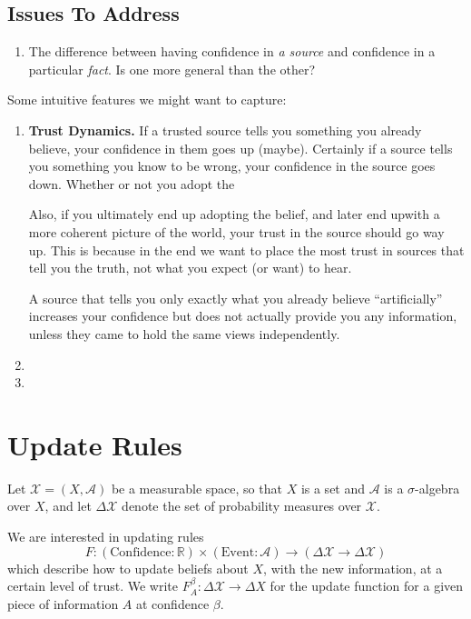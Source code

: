\documentclass{article}
\begin{document}
\subsection*{Issues To Address}
\begin{enumerate}
    \item The difference between having confidence in \emph{a source} and confidence in a particular \emph{fact}.  Is one more general than the other?
\end{enumerate}

Some intuitive features we might want to capture:
\begin{enumerate}

    \item \textbf{Trust Dynamics.} If a trusted source tells you something you already believe, your confidence in them goes up (maybe). Certainly if a source tells you something you know to be wrong, your confidence in the source goes down.  Whether or not you adopt the

    Also, if you ultimately end up adopting the belief, and later end upwith a more coherent picture of the world, your trust in the source should go way up.
    This is because in the end we want to place the most trust in sources that tell you the truth, not what you expect (or want) to hear.

    A source that tells you only exactly what you already believe ``artificially'' increases your confidence but does not actually provide you any information, unless they came to hold the same views independently.

    \item
    \item
\end{enumerate}

\section{Update Rules}
\def\X{\mathcal X}
Let $\X = (X, \mathcal A)$ be a measurable space, so that $X$ is a set and $\mathcal A$ is a $\sigma$-algebra over $X$, and let $\Delta \X$ denote the set of probability measures over $\X$.


We are interested in updating rules
\[
    F: (\text{Confidence} : \mathbb R) \times (\text{Event} : \mathcal A) \to (\Delta\X  \to \Delta \X)
\]
which describe how to update beliefs about $X$, with the new information, at a certain level of trust. We write $F^\beta_A : \Delta\X \to \Delta X$ for the update function for a given piece of information $A$ at confidence $\beta$.
\end{document}
